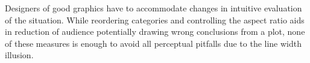 Designers of good graphics have to accommodate changes in intuitive evaluation of the situation. While reordering categories and controlling the aspect ratio aids in reduction of audience potentially drawing wrong conclusions from a plot, none of these measures is enough to avoid all perceptual pitfalls due to the line width illusion.




%



%
%
%
%


